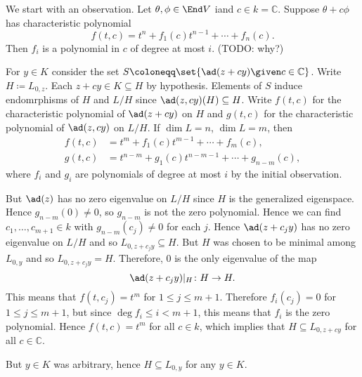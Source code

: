We start with an observation. Let $\theta, \phi \in \End V$ iand $c \in k = \mathbb{C}$.
Suppose $\theta + c\phi$ has characteristic polynomial
\[ f(t, c) = t^n + f_1(c)t^{n-1} + \cdots + f_n(c). \]
 Then $f_i$ is a polynomial in $c$ of degree  at most $i$. (TODO: why?)

For $y \in K$ consider the set $S \coloneqq \set{\ad(z + cy)\given c \in \mathbb{C}}$.
Write $H\coloneqq L_{0, z}$. Each $z + cy \in K \subseteq H$ by hypothesis.
Elements of $S$ induce endomrphisms of $H$ and $L/H$ since
$\ad(z, cy)(H) \subseteq H$. Write $f(t, c)$ for the characteristic
polynomial of $\ad(z + cy)$ on $H$ and $g(t, c)$ for the characteristic
polynomial of $\ad(z, cy)$ on $L/H$. If $\dim L = n$, $\dim L = m$, then
\begin{align*}
	f(t, c) &= t^m + f_1(c)t^{m-1} + \cdots + f_m(c),\\
	g(t, c) &= t^{n-m} + g_1(c)t^{n-m-1} + \cdots + g_{n - m}(c),
\end{align*}
where $f_i$ and $g_i$ are polynomials of degree at most $i$ by the initial observation.

But $\ad(z)$ has no zero eigenvalue on $L/H$ since $H$ is the generalized eigenspace.
Hence $g_{n-m}(0) \neq 0$, so $g_{n-m}$ is not the zero polynomial. Hence we can find
$c_1, \ldots, c_{m+1} \in k$ with $g_{n-m}(c_j)\neq 0$ for each $j$. Hence
$\ad(z + c_jy)$ has no zero eigenvalue on $L/H$ and so $L_{0, z + c_jy} \subseteq H$.
But $H$ was chosen to be minimal among $L_{0, y}$ and so $L_{0, z+c_jy} = H$.
Therefore, $0$ is the only eigenvalue of the map
\[ \ad(z + c_jy)|_H\colon H\to H. \]
This means that $f(t, c_j) = t^m$ for $1\leq j\leq m+1$. Therefore
$f_i(c_j) = 0$ for $1\leq j\leq m+1$, but since $\deg f_i\leq i < m+1$, this means
that $f_i$ is the zero polynomial. Hence $f(t, c) = t^m$ for all $c \in k$, which
implies that $H \subseteq L_{0, z+cy}$ for all $c \in \mathbb{C}$.

But $y \in K$ was arbitrary, hence $H \subseteq L_{0, y}$ for any $y \in K$.

